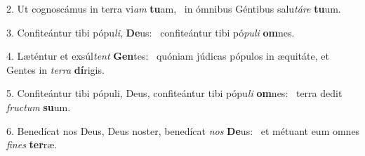 2. Ut cognoscámus in terra vi\textit{am} \textbf{tu}am, \ast\  in ómnibus Géntibus salu\textit{tá}\textit{re} \textbf{tu}um.\

3. Confiteántur tibi pópu\textit{li}, \textbf{De}us: \ast\  confiteántur tibi pó\textit{pu}\textit{li} \textbf{om}nes.\

4. Læténtur et exsúl\textit{tent} \textbf{Gen}tes: \ast\  quóniam júdicas pópulos in æquitáte, et Gentes in \textit{ter}\textit{ra} \textbf{dí}rigis.\

5. Confiteántur tibi pópuli, Deus, confiteántur tibi pópu\textit{li} \textbf{om}nes: \ast\  terra dedit \textit{fruc}\textit{tum} \textbf{su}um.\

6. Benedícat nos Deus, Deus noster, benedícat \textit{nos} \textbf{De}us: \ast\  et métuant eum omnes \textit{fi}\textit{nes} \textbf{ter}ræ.\

